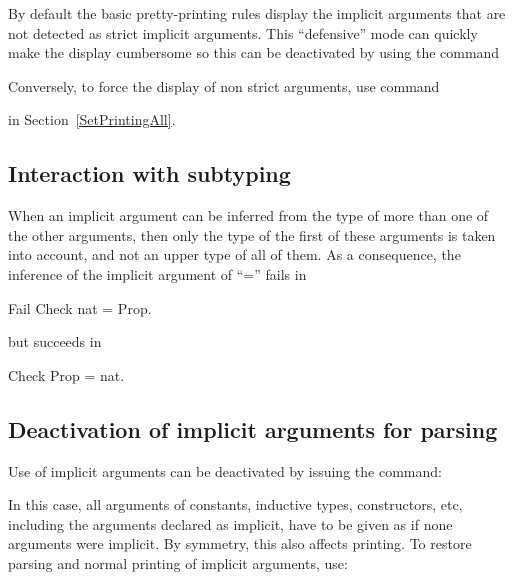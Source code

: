 By default the basic pretty-printing rules display the implicit arguments that are not detected as strict implicit arguments. This ``defensive'' mode can quickly make the display cumbersome so this can be deactivated by using the command
\begin{quote}
{}
\end{quote}
Conversely, to force the display of non strict arguments, use command
\begin{quote}
{}
\end{quote}

 in Section~\ref{SetPrintingAll}.

\subsection{Interaction with subtyping}

When an implicit argument can be inferred from the type of more than
one of the other arguments, then only the type of the first of these
arguments is taken into account, and not an upper type of all of
them.  As a consequence, the inference of the implicit argument of
``='' fails in
\begin{coq_example*}
Fail Check nat = Prop.
\end{coq_example*}

but succeeds in
\begin{coq_example*}
Check Prop = nat.
\end{coq_example*}

\subsection{Deactivation of implicit arguments for parsing}

Use of implicit arguments can be deactivated by issuing the command:
\begin{quote}
{}
\end{quote}

In this case, all arguments of constants, inductive types,
constructors, etc, including the arguments declared as implicit, have
to be given as if none arguments were implicit. By symmetry, this also
affects printing. To restore parsing and normal printing of implicit
arguments, use:
\begin{quote}
{}
\end{quote}


